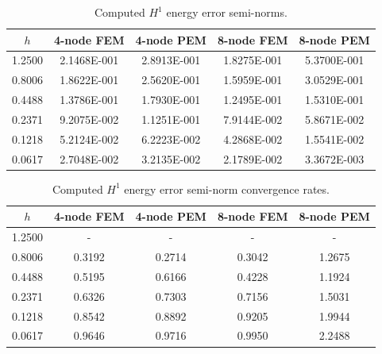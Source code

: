 \begin{table}[!ht]
  \begin{center}
    \begin{tabular}{| c | c | c | c | c |}
    \hline
    $h$ & 4-node FEM & 4-node PEM & 8-node FEM & 8-node PEM \\ \hline
    1.2500 & 2.1468E-001 & 2.8913E-001 & 1.8275E-001 & 5.3700E-001 \\ \hline
    0.8006 & 1.8622E-001 & 2.5620E-001 & 1.5959E-001 & 3.0529E-001 \\ \hline
    0.4488 & 1.3786E-001 & 1.7930E-001 & 1.2495E-001 & 1.5310E-001 \\ \hline
    0.2371 & 9.2075E-002 & 1.1251E-001 & 7.9144E-002 & 5.8671E-002 \\ \hline
    0.1218 & 5.2124E-002 & 6.2223E-002 & 4.2868E-002 & 1.5541E-002 \\ \hline
    0.0617 & 2.7048E-002 & 3.2135E-002 & 2.1789E-002 & 3.3672E-003 \\
    \hline
    \end{tabular}
    \caption{Computed $H^1$ energy error semi-norms.}
    \vspace{-5pt}
    \label{tab:h1_error}
    \vspace{-25pt}
  \end{center}
\end{table}
\begin{table}[!ht]
  \begin{center}
    \begin{tabular}{| c | c | c | c | c |}
    \hline
    $h$ & 4-node FEM & 4-node PEM & 8-node FEM & 8-node PEM \\ \hline
    1.2500 &	-	&	-	&	-	&       -      \\ \hline
    0.8006 &	0.3192	&	0.2714	&	0.3042	&	1.2675 \\ \hline
    0.4488 &	0.5195	&	0.6166	&	0.4228	&	1.1924 \\ \hline
    0.2371 &	0.6326	&	0.7303	&	0.7156	&	1.5031 \\ \hline
    0.1218 &	0.8542	&	0.8892	&	0.9205	&	1.9944 \\ \hline
    0.0617 &	0.9646	&	0.9716	&	0.9950	&	2.2488 \\
    \hline
    \end{tabular}
    \caption{Computed $H^1$ energy error semi-norm convergence rates.}
    \vspace{-5pt}
    \label{tab:h1_rates}
    \vspace{-25pt}
  \end{center}
\end{table}
